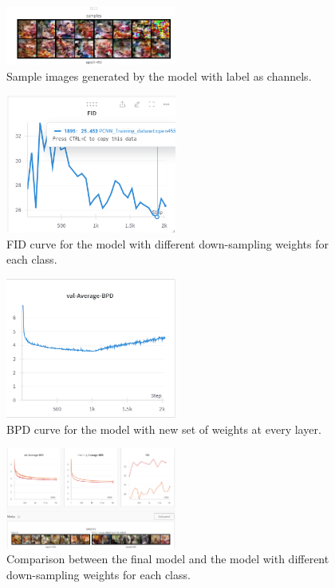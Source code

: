 \documentclass{article}
\begin{document}
\begin{figure}
    \centering
    \includegraphics[width=0.5\textwidth]{report_data/f-lc-samples.png}
    \caption{ Sample images generated by the model with label as channels.}
    \label{fig:f-lc-samples}
\end{figure}

\begin{figure}
    \centering
    \includegraphics[width=0.5\textwidth]{report_data/f_1_fid.png}
    \caption{ FID curve for the model with different down-sampling weights for each class.}
    \label{fig:F-FID}
  \end{figure}

\begin{figure}
    \centering
    \includegraphics[width=0.5\textwidth]{report_data/f_2_BPD.png}
    \caption{BPD curve for the model with new set of weights at every layer.}
    \label{fig:F-BPD}
  \end{figure}
  \begin{figure}
    \centering
    \includegraphics[width=0.5\textwidth]{report_data/f_pp_cmp.png}
    \caption{Comparison between the final model and the model with different down-sampling weights for each class.}
    \label{fig:F-BPD}
  \end{figure}
\end{document}
